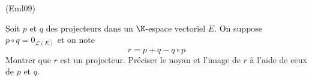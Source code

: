 \begin{tiny}(Eml09)\end{tiny} Soit $p$ et $q$ des projecteurs dans un $\K$-espace vectoriel $E$. On suppose $p\circ q =0_{\mathcal{L}(E)}$ et on note
\begin{displaymath}
 r = p+q-q\circ p
\end{displaymath}
Montrer que $r$ est un projecteur. Préciser le noyau et l'image de $r$ à l'aide de ceux de $p$ et $q$. 